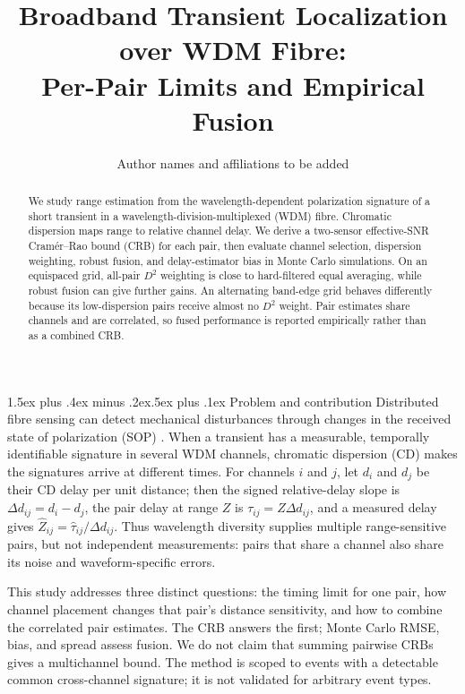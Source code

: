 \documentclass[10pt]{article}
\title{\vspace{-1.2em}\bfseries Broadband Transient Localization over WDM Fibre:\\
Per-Pair Limits and Empirical Fusion}
\author{Author names and affiliations to be added}
\date{}
\makeatletter
\renewcommand\section{\@startsection{section}{1}{\z@}%
  {1.5ex plus .4ex minus .2ex}{.5ex plus .1ex}%
  {\normalfont\large\bfseries}}
\makeatother
\begin{document}
\maketitle
\vspace{-2.1em}

\begin{abstract}
We study range estimation from the wavelength-dependent polarization signature of a short transient in a wavelength-division-multiplexed (WDM) fibre. Chromatic dispersion maps range to relative channel delay. We derive a two-sensor effective-SNR Cram\'er--Rao bound (CRB) for each pair, then evaluate channel selection, dispersion weighting, robust fusion, and delay-estimator bias in Monte Carlo simulations. On an equispaced grid, all-pair $D^2$ weighting is close to hard-filtered equal averaging, while robust fusion can give further gains. An alternating band-edge grid behaves differently because its low-dispersion pairs receive almost no $D^2$ weight. Pair estimates share channels and are correlated, so fused performance is reported empirically rather than as a combined CRB.
\end{abstract}

\section{Problem and contribution}
Distributed fibre sensing can detect mechanical disturbances through changes in the received state of polarization (SOP) \cite{he2021das}. When a transient has a measurable, temporally identifiable signature in several WDM channels, chromatic dispersion (CD) makes the signatures arrive at different times. For channels $i$ and $j$, let $d_i$ and $d_j$ be their CD delay per unit distance; then the signed relative-delay slope is $\Delta d_{ij}=d_i-d_j$, the pair delay at range $Z$ is $\tau_{ij}=Z\Delta d_{ij}$, and a measured delay gives $\hat Z_{ij}=\hat\tau_{ij}/\Delta d_{ij}$. Thus wavelength diversity supplies multiple range-sensitive pairs, but not independent measurements: pairs that share a channel also share its noise and waveform-specific errors.

This study addresses three distinct questions: the timing limit for one pair, how channel placement changes that pair's distance sensitivity, and how to combine the correlated pair estimates. The CRB answers the first; Monte Carlo RMSE, bias, and spread assess fusion. We do not claim that summing pairwise CRBs gives a multichannel bound. The method is scoped to events with a detectable common cross-channel signature; it is not validated for arbitrary event types.
\end{document}
